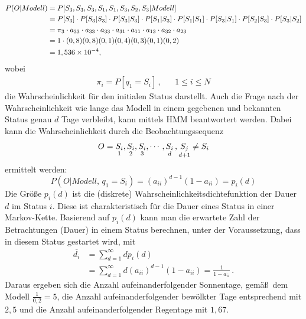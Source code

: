 \begin{align}
P(O|Modell) &= P[S_3, S_3, S_3, S_1, S_1, S_3, S_2, S_3| Modell] \notag \\
 &= P[S_3] \cdot P[S_3|S_3] \cdot P[S_3|S_3] \cdot P[S_1|S_3] \cdot P[S_1|S_1] \cdot P[S_3|S_1] \cdot P[S_2|S_3] \cdot P[S_3|S_2] \notag \\
 &= \pi _3 \cdot a_{33} \cdot a_{33} \cdot a_{33} \cdot a_{31} \cdot a_{11} \cdot a_{13} \cdot a_{32} \cdot a_{23}\notag \\
 &= 1 \cdot (0,8) (0,8) (0,1) (0,4) (0,3) (0,1) (0,2)\notag\\ 
 &= 1,536 \times 10^{-4}, \notag
\end{align}
wobei
\begin{align} \label{E:PropMarkovWetterPi}
\pi _i = P[q_1 = S_i]\, , & & 1 \leq i \leq N
\end{align}
die Wahrscheinlichkeit f\"ur den initialen Status darstellt.
\newline
Auch die Frage nach der Wahrscheinlichkeit wie lange das Modell in einem gegebenen und bekannten Status genau $d$ Tage verbleibt, kann mittels \gls{HMM} beantwortert werden. Dabei kann die Wahrscheinlichkeit durch die Beobachtungssequenz
\begin{equation}
O = {\underset{1}{S_i}, \underset{2}{S_i}, \underset{3}{S_i}, \cdots, \underset{d}{S_i}\, , \underset{d+1}{S_j} \ne S_i} \notag
\end{equation}
ermittelt werden:
\begin{equation}
\label{E:PropMarkovD}
P(O | Modell,\, q_1 = S_i) = (a_{ii})^{d-1}(1 - a_{ii}) = p_i(d)
\end{equation}
Die Gr\"o\ss e $p_i(d)$ ist die (diskrete) Wahrscheinlichkeitsdichtefunktion der Dauer $d$ im Status $i$. Diese ist charakteristisch f\"ur die Dauer eines Status in einer Markov-Kette. Basierend auf $p_i(d)$ kann man die erwartete Zahl der Betrachtungen (Dauer) in einem Status berechnen, unter der Voraussetzung, dass in diesem Status gestartet wird, mit
\begin{subequations}\label{E:MarkovDuration}
    \begin{alignat}{2}
      \overline{d_i} &= \sum_{d= 1}^{\infty} dp_i(d)\label{E:MarkovDuration1}\\
      &= \sum_{d = 1}^{\infty} d(a_{ii})^{d - 1} (1 - a_{ii}) = \frac{1}{1 - a_{ii}} \, . \label{E:MarkovDuration2}
    \end{alignat}
  \end{subequations}
Daraus ergeben sich die Anzahl aufeinanderfolgender Sonnentage, gem\"a\ss \, dem Modell $\frac{1}{0,2} = 5$,  die Anzahl aufeinanderfolgender bew\"olkter Tage entsprechend mit $2,5$ und die Anzahl aufeinanderfolgender Regentage mit $1,67$.


